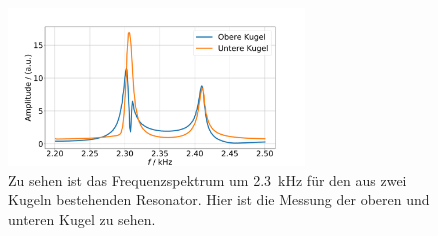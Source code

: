 \begin{figure}
    \centering
    \includegraphics[width=0.7\textwidth]{plots/D_phase.pdf}
    \caption{Zu sehen ist das Frequenzspektrum um \SI{2.3}{\kilo\hertz} für den aus zwei Kugeln bestehenden Resonator. Hier ist die Messung der oberen und unteren Kugel zu sehen.}
    \label{fig:phase}
\end{figure}